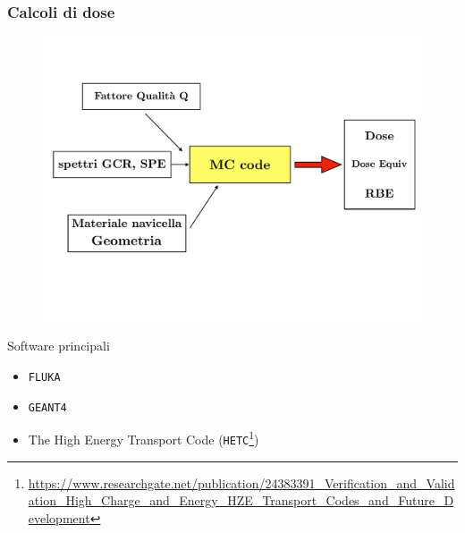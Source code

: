 \documentclass[9pt]{beamer}
\begin{document}

\begin{frame} [fragile]
	\frametitle{Calcoli di dose}
		\begin{figure}
	  \centering
			\includegraphics[scale=0.20]{figures/mc.pdf}
		\end{figure}

\begin{exampleblock}{Software principali}
\begin{itemize}
\item \texttt{FLUKA}
\item \texttt{GEANT4}
\item The High Energy Transport Code (\texttt{HETC}\footnote{\url{https://www.researchgate.net/publication/24383391_Verification_and_Validation_High_Charge_and_Energy_HZE_Transport_Codes_and_Future_Development}})
\end{itemize}
\end{exampleblock}

\end{frame}

\end{document}
